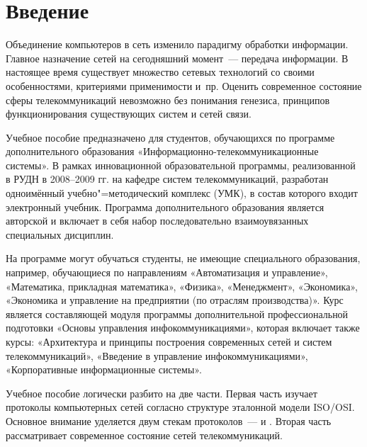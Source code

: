 
\chapter*{Введение}
\label{cha:intro}
\iftexht
\else
\fi    


Объединение компьютеров в сеть изменило парадигму обработки
информации. Главное назначение сетей на сегодняшний момент~---
передача информации. В настоящее время существует множество сетевых
технологий со своими особенностями, критериями применимости
и~пр. Оценить современное состояние сферы телекоммуникаций невозможно
без понимания генезиса, принципов функционирования существующих систем
и сетей связи.


Учебное пособие предназначено для студентов, обучающихся по программе
дополнительного образования «Информационно-телекоммуникационные
системы». В рамках инновационной образовательной программы,
реализованной в РУДН в 2008--2009 гг. на кафедре систем
телекоммуникаций, разработан одноимённый учебно"=методический комплекс
(УМК), в состав которого входит электронный учебник. Программа
дополнительного образования является авторской и включает в себя набор
последовательно взаимоувязанных специальных дисциплин.

На программе могут обучаться студенты, не имеющие специального
образования, например, обучающиеся по направлениям «Автоматизация и
управление», «Математика, прикладная математика», «Физика»,
«Менеджмент», «Экономика», «Экономика и управление на предприятии (по
отраслям производства)».  Курс является составляющей модуля программы
дополнительной профессиональной подготовки «Основы управления
инфокоммуникациями», которая включает также курсы: «Архитектура и
принципы построения современных сетей и систем телекоммуникаций»,
«Введение в управление инфокоммуникациями», «Корпоративные
информационные системы».



Учебное пособие логически разбито на две части. 
Первая часть изучает протоколы компьютерных сетей согласно структуре
эталонной модели ISO/OSI.   Основное внимание уделяется двум стекам
протоколов~---  и . Вторая часть рассматривает
современное состояние сетей телекоммуникаций.

